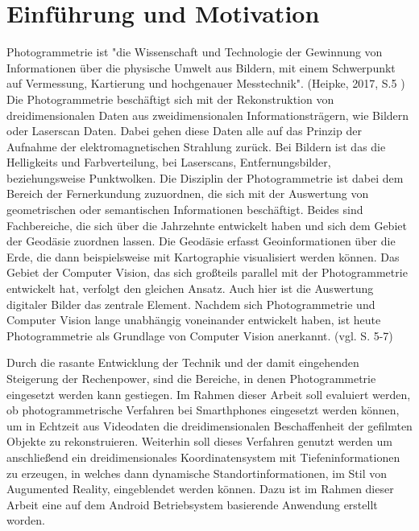 \chapter{Einführung und Motivation}

Photogrammetrie ist "die Wissenschaft und Technologie der Gewinnung von Informationen
über die physische Umwelt aus Bildern, mit einem Schwerpunkt auf Vermessung,
Kartierung und hochgenauer Messtechnik". (Heipke, 2017, S.5 \cite{photo})  Die Photogrammetrie beschäftigt sich  mit der Rekonstruktion von dreidimensionalen Daten aus zweidimensionalen Informationsträgern, wie Bildern oder Laserscan Daten. Dabei gehen diese Daten alle auf das Prinzip der Aufnahme der elektromagnetischen Strahlung zurück. Bei Bildern ist das die Helligkeits und Farbverteilung, bei Laserscans, Entfernungsbilder, beziehungsweise Punktwolken. Die Disziplin der Photogrammetrie ist dabei dem Bereich der Fernerkundung zuzuordnen, die sich mit der Auswertung von geometrischen oder semantischen Informationen beschäftigt. Beides sind Fachbereiche, die sich über die Jahrzehnte entwickelt haben und sich dem Gebiet der Geodäsie zuordnen lassen. Die Geodäsie erfasst Geoinformationen über die Erde, die dann beispielsweise mit Kartographie visualisiert werden können. Das Gebiet der Computer Vision, das sich großteils parallel mit der Photogrammetrie entwickelt hat, verfolgt den gleichen Ansatz. Auch hier ist die Auswertung digitaler Bilder das zentrale Element. Nachdem sich Photogrammetrie und Computer Vision lange unabhängig voneinander entwickelt haben, ist heute Photogrammetrie als Grundlage von Computer Vision anerkannt. (vgl. \cite{photo} S. 5-7)

Durch die rasante Entwicklung der Technik und der damit eingehenden Steigerung der Rechenpower, sind die Bereiche, in denen Photogrammetrie eingesetzt werden kann gestiegen. Im Rahmen dieser Arbeit soll evaluiert werden, ob photogrammetrische Verfahren bei Smarthphones eingesetzt werden können, um in Echtzeit aus Videodaten die dreidimensionalen Beschaffenheit der gefilmten Objekte zu rekonstruieren. Weiterhin soll dieses Verfahren genutzt werden um anschließend ein dreidimensionales Koordinatensystem mit Tiefeninformationen zu erzeugen, in welches dann dynamische Standortinformationen, im Stil von Augumented Reality, eingeblendet werden können. Dazu ist im Rahmen dieser Arbeit eine auf dem Android Betriebsystem basierende Anwendung erstellt worden.



  


